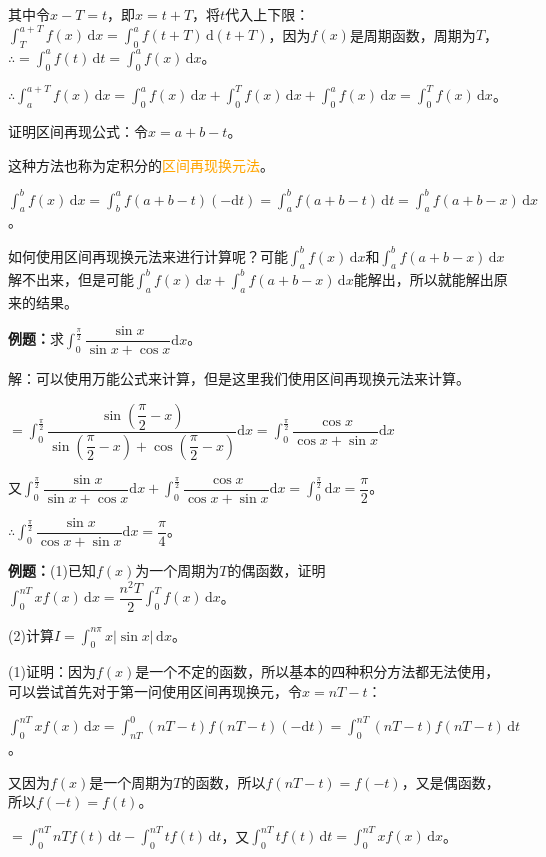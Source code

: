 \documentclass[UTF8, 12pt]{ctexart}
\begin{document}
其中令$x-T=t$，即$x=t+T$，将$t$代入上下限：$\int_T^{a+T}f(x)\,\textrm{d}x=\int_0^af(t+T)\,\textrm{d}(t+T)$，因为$f(x)$是周期函数，周期为$T$，$\therefore=\int_0^af(t)\,\textrm{d}t=\int_0^af(x)\,\textrm{d}x$。

$\therefore\int_a^{a+T}f(x)\,\textrm{d}x=\int_0^af(x)\,\textrm{d}x+\int_0^Tf(x)\,\textrm{d}x+\int_0^af(x)\,\textrm{d}x=\int_0^Tf(x)\,\textrm{d}x$。

证明区间再现公式：令$x=a+b-t$。

这种方法也称为定积分的\textcolor{orange}{区间再现换元法}。

$\int_a^bf(x)\,\textrm{d}x=\int_b^af(a+b-t)(-\textrm{d}t)=\int_a^bf(a+b-t)\,\textrm{d}t=\int_a^bf(a+b-x)\,\textrm{d}x$。

如何使用区间再现换元法来进行计算呢？可能$\int_a^bf(x)\,\textrm{d}x$和$\int_a^bf(a+b-x)\,\textrm{d}x$解不出来，但是可能$\int_a^bf(x)\,\textrm{d}x+\int_a^bf(a+b-x)\,\textrm{d}x$能解出，所以就能解出原来的结果。

\textbf{例题：}求$\displaystyle{\int_0^\frac{\pi}{2}\dfrac{\sin x}{\sin x+\cos x}\textrm{d}x}$。

解：可以使用万能公式来计算，但是这里我们使用区间再现换元法来计算。

$=\displaystyle{\int_0^\frac{\pi}{2}\dfrac{\sin(\dfrac{\pi}{2}-x)}{\sin(\dfrac{\pi}{2}-x)+\cos(\dfrac{\pi}{2}-x)}\textrm{d}x=\int_0^\frac{\pi}{2}\dfrac{\cos x}{\cos x+\sin x}\textrm{d}x}$

又$\displaystyle{\int_0^\frac{\pi}{2}\dfrac{\sin x}{\sin x+\cos x}\textrm{d}x+\int_0^\frac{\pi}{2}\dfrac{\cos x}{\cos x+\sin x}\textrm{d}x}$$=\int_0^\frac{\pi}{2}\textrm{d}x=\dfrac{\pi}{2}$。

$\therefore\displaystyle{\int_0^\frac{\pi}{2}\dfrac{\sin x}{\cos x+\sin x}\textrm{d}x}=\dfrac{\pi}{4}$。

\textbf{例题：}(1)已知$f(x)$为一个周期为$T$的偶函数，证明$\int_0^{nT}xf(x)\,\textrm{d}x=\dfrac{n^2T}{2}\int_0^Tf(x)\,\textrm{d}x$。

(2)计算$I=\int_0^{n\pi}x\vert\sin x\vert\,\textrm{d}x$。

(1)证明：因为$f(x)$是一个不定的函数，所以基本的四种积分方法都无法使用，可以尝试首先对于第一问使用区间再现换元，令$x=nT-t$：

$\int_0^{nT}xf(x)\,\textrm{d}x=\int_{nT}^0(nT-t)f(nT-t)(-\textrm{d}t)=\int_0^{nT}(nT-t)f(nT-t)\,\textrm{d}t$。

又因为$f(x)$是一个周期为$T$的函数，所以$f(nT-t)=f(-t)$，又是偶函数，所以$f(-t)=f(t)$。

$=\int_0^{nT}nTf(t)\,\textrm{d}t-\int_0^{nT}tf(t)\,\textrm{d}t$，又$\int_0^{nT}tf(t)\,\textrm{d}t=\int_0^{nT}xf(x)\,\textrm{d}x$。
\end{document}
